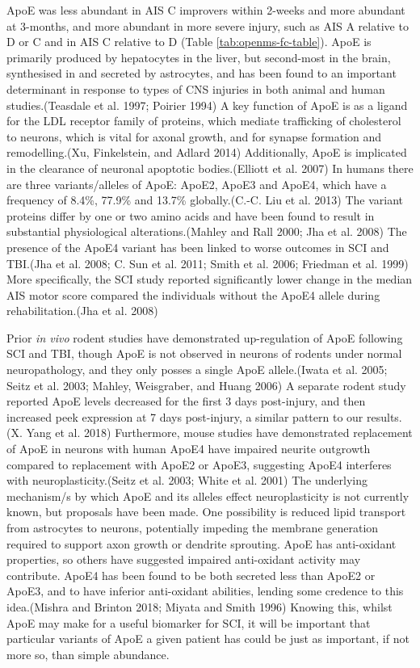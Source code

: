 \documentclass[9pt,lineno]{elife}
\begin{document}
ApoE was less abundant in AIS C improvers within 2-weeks and more abundant at 3-months, and more abundant in more severe injury, such as AIS A relative to D or C and in AIS C relative to D (Table \ref{tab:openms-fc-table}).
ApoE is primarily produced by hepatocytes in the liver, but second-most in the brain, synthesised in and secreted by astrocytes, and has been found to an important determinant in response to types of CNS injuries in both animal and human studies.(Teasdale et al. 1997; Poirier 1994)
A key function of ApoE is as a ligand for the LDL receptor family of proteins, which mediate trafficking of cholesterol to neurons, which is vital for axonal growth, and for synapse formation and remodelling.(Xu, Finkelstein, and Adlard 2014)
Additionally, ApoE is implicated in the clearance of neuronal apoptotic bodies.(Elliott et al. 2007)
In humans there are three variants/alleles of ApoE: ApoE2, ApoE3 and ApoE4, which have a frequency of 8.4\%, 77.9\% and 13.7\% globally.(C.-C. Liu et al. 2013)
The variant proteins differ by one or two amino acids and have been found to result in substantial physiological alterations.(Mahley and Rall 2000; Jha et al. 2008)
The presence of the ApoE4 variant has been linked to worse outcomes in SCI and TBI.(Jha et al. 2008; C. Sun et al. 2011; Smith et al. 2006; Friedman et al. 1999)
More specifically, the SCI study reported significantly lower change in the median AIS motor score compared the individuals without the ApoE4 allele during rehabilitation.(Jha et al. 2008)

Prior \emph{in vivo} rodent studies have demonstrated up-regulation of ApoE following SCI and TBI, though ApoE is not observed in neurons of rodents under normal neuropathology, and they only posses a single ApoE allele.(Iwata et al. 2005; Seitz et al. 2003; Mahley, Weisgraber, and Huang 2006)
A separate rodent study reported ApoE levels decreased for the first 3 days post-injury, and then increased peek expression at 7 days post-injury, a similar pattern to our results.(X. Yang et al. 2018)
Furthermore, mouse studies have demonstrated replacement of ApoE in neurons with human ApoE4 have impaired neurite outgrowth compared to replacement with ApoE2 or ApoE3, suggesting ApoE4 interferes with neuroplasticity.(Seitz et al. 2003; White et al. 2001)
The underlying mechanism/s by which ApoE and its alleles effect neuroplasticity is not currently known, but proposals have been made.
One possibility is reduced lipid transport from astrocytes to neurons, potentially impeding the membrane generation required to support axon growth or dendrite sprouting.
ApoE has anti-oxidant properties, so others have suggested impaired anti-oxidant activity may contribute.
ApoE4 has been found to be both secreted less than ApoE2 or ApoE3, and to have inferior anti-oxidant abilities, lending some credence to this idea.(Mishra and Brinton 2018; Miyata and Smith 1996)
Knowing this, whilst ApoE may make for a useful biomarker for SCI, it will be important that particular variants of ApoE a given patient has could be just as important, if not more so, than simple abundance.
\end{document}
